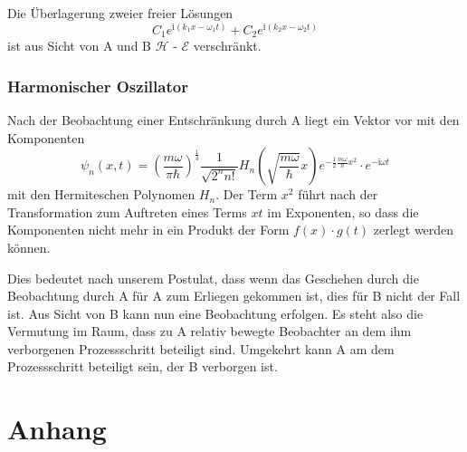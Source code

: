 \documentclass[12pt]{article}
\begin{document}
Die Überlagerung zweier freier Lösungen
\begin{equation*}
C_1 e^{\mathrm{i}(k_1 x-\omega_1 t)} + C_2 e^{\mathrm{i}(k_2 x-\omega_2 t)}
\end{equation*}
ist aus Sicht von A und B $\mathscr{H}$ - $\mathscr{E}$  verschränkt.

\subsubsection{Harmonischer Oszillator}

Nach der Beobachtung einer Entschränkung durch A liegt ein Vektor vor mit den Komponenten 
\begin{equation*}
\psi _{n}(x,t)=\left({\frac {m\omega }{\pi \hbar }}\right)^{\frac {1}{4}}{\frac {1}{\sqrt {2^{n}n!}}}H_{n}\left({\sqrt {\frac {m\omega }{\hbar }}}x\right)e^{-{\frac {1}{2}}{\frac {m\omega }{\hbar }}x^{2}} \cdot e^{-\mathrm{i}\omega t}
\end{equation*}
mit den Hermiteschen Polynomen $H_n$. Der Term $x^2$ führt nach der Transformation zum Auftreten eines Terms $xt$ im Exponenten, so dass die Komponenten nicht mehr in ein Produkt der Form $f(x) \cdot g(t)$ zerlegt werden können.

Dies bedeutet nach unserem Postulat, dass wenn das Geschehen durch die Beobachtung durch A für A zum Erliegen gekommen ist, dies für B nicht der Fall ist. Aus Sicht von B kann nun eine Beobachtung erfolgen. Es steht also die Vermutung im Raum, dass zu A relativ bewegte Beobachter an dem ihm verborgenen Prozessschritt beteiligt sind. Umgekehrt kann A am dem Prozessschritt beteiligt sein, der B verborgen ist.

\section{Anhang}
\end{document}
